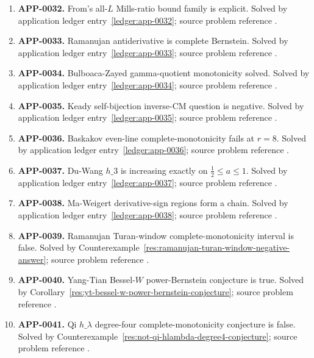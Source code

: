 \documentclass[11pt]{article}
\numberwithin{equation}{section}
\theoremstyle{definition}
\theoremstyle{remark}
\newcommand{\1}{\mathbf 1}
\begin{document}
\begin{enumerate}
\item \label{ledger:app-0032}\textbf{APP-0032.} From's all-\(L\) Mills-ratio bound family is explicit. Solved by application ledger entry~\ref{ledger:app-0032}; source problem reference \cite{from-mills}.
\item \label{ledger:app-0033}\textbf{APP-0033.} Ramanujan antiderivative is complete Bernstein. Solved by application ledger entry~\ref{ledger:app-0033}; source problem reference \cite{mishra-swaminathan-ramanujan}.
\item \label{ledger:app-0034}\textbf{APP-0034.} Bulboaca-Zayed gamma-quotient monotonicity solved. Solved by application ledger entry~\ref{ledger:app-0034}; source problem reference \cite{bulboaca-zayed-gamma}.
\item \label{ledger:app-0035}\textbf{APP-0035.} Keady self-bijection inverse-CM question is negative. Solved by application ledger entry~\ref{ledger:app-0035}; source problem reference \cite{app-app-0035-source}.
\item \label{ledger:app-0036}\textbf{APP-0036.} Baskakov even-line complete-monotonicity fails at \(r=8\). Solved by application ledger entry~\ref{ledger:app-0036}; source problem reference \cite{abel-gawronski-neuschel}.
\item \label{ledger:app-0037}\textbf{APP-0037.} Du-Wang \(h\_3\) is increasing exactly on \(\frac12\le a\le1\). Solved by application ledger entry~\ref{ledger:app-0037}; source problem reference \cite{du-wang-h3}.
\item \label{ledger:app-0038}\textbf{APP-0038.} Ma-Weigert derivative-sign regions form a chain. Solved by application ledger entry~\ref{ledger:app-0038}; source problem reference \cite{ma-weigert-log-functions}.
\item \label{ledger:app-0039}\textbf{APP-0039.} Ramanujan Turan-window complete-monotonicity interval is false. Solved by Counterexample~\ref{res:ramanujan-turan-window-negative-answer}; source problem reference \cite{mishra-swaminathan-ramanujan}.
\item \label{ledger:app-0040}\textbf{APP-0040.} Yang-Tian Bessel-\(W\) power-Bernstein conjecture is true. Solved by Corollary~\ref{res:yt-bessel-w-power-bernstein-conjecture}; source problem reference \cite{app-app-0040-source}.
\item \label{ledger:app-0041}\textbf{APP-0041.} Qi \(h\_\lambda\) degree-four complete-monotonicity conjecture is false. Solved by Counterexample~\ref{res:not-qi-hlambda-degree4-conjecture}; source problem reference \cite{qi-hlambda}.

\end{enumerate}
\end{document}

